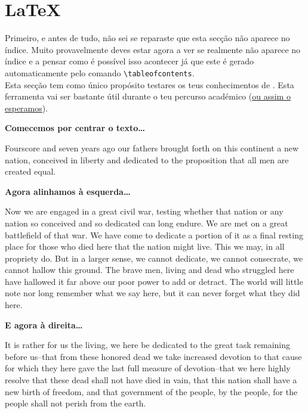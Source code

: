 \documentclass[a4paper,11pt]{article}
\begin{document}

\newpage

\section*{\LaTeX}\label{sec:formulas}
Primeiro, e antes de tudo, não sei se reparaste que esta secção não aparece no índice. Muito provavelmente deves estar agora a ver se realmente não aparece no índice e a pensar como é possível isso acontecer já que este é gerado automaticamente pelo comando \verb|\tableofcontents|.\\
\newline
Esta secção tem como único propósito testares os teus conhecimentos de \fbox{\LaTeX}\@. Esta ferramenta vai ser bastante útil durante o teu percurso académico (\underline{ou assim o esperamos}).\\
\newline

\textbf{Comecemos por centrar o texto\ldots}
\begin{center}
Fourscore and seven years ago our fathers brought forth on this continent a new nation, conceived in liberty and dedicated to the proposition that all men are created equal.
\end{center}

\textbf{Agora alinhamos à esquerda\ldots}
\begin{flushleft}
Now we are engaged in a great civil war, testing whether that nation or any nation so conceived and so dedicated can long endure. We are met on a great battlefield of that war. We have come to dedicate a portion of it as a final resting place for those who died here that the nation might live. This we may, in all propriety do. But in a larger sense, we cannot dedicate, we cannot consecrate, we cannot hallow this ground. The brave men, living and dead who struggled here have hallowed it far above our poor power to add or detract. The world will little note nor long remember what we say here, but it can never forget what they did here.
\end{flushleft}

\textbf{E agora à direita\ldots}
\begin{flushright}
It is rather for us the living, we here be dedicated to the great task remaining before us--that from these honored dead we take increased devotion to that cause for which they here gave the last full measure of devotion--that we here highly resolve that these dead shall not have died in vain, that this nation shall have a new birth of freedom, and that government of the people, by the people, for the people shall not perish from the earth.
\end{flushright}
\end{document}
